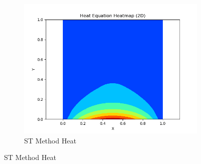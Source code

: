 \begin{figure}[H]
\begin{subfigure}{0.33\textwidth}
        \centering  
        \includegraphics[width=0.9\linewidth]{./pics/final/spacetime/regular/f1heat.png}  
        \caption{ST Method Heat}
    \end{subfigure} 
\end{figure} 


